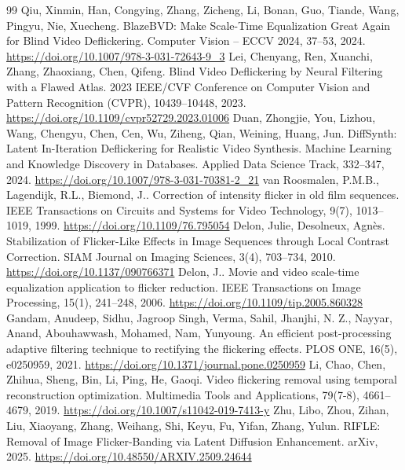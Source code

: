 \documentclass[twocolumn,10pt]{svjour3}
\begin{document}
\begin{thebibliography}{99}
\footnotesize
\setlength{\itemsep}{0pt}
\setlength{\parsep}{0pt}
 Qiu, Xinmin, Han, Congying, Zhang, Zicheng, Li, Bonan, Guo, Tiande, Wang, Pingyu, Nie, Xuecheng. BlazeBVD: Make Scale-Time Equalization Great Again for Blind Video Deflickering. Computer Vision – ECCV 2024, 37–53, 2024. \url{https://doi.org/10.1007/978-3-031-72643-9_3}
 Lei, Chenyang, Ren, Xuanchi, Zhang, Zhaoxiang, Chen, Qifeng. Blind Video Deflickering by Neural Filtering with a Flawed Atlas. 2023 IEEE/CVF Conference on Computer Vision and Pattern Recognition (CVPR), 10439–10448, 2023. \url{https://doi.org/10.1109/cvpr52729.2023.01006}
 Duan, Zhongjie, You, Lizhou, Wang, Chengyu, Chen, Cen, Wu, Ziheng, Qian, Weining, Huang, Jun. DiffSynth: Latent In-Iteration Deflickering for Realistic Video Synthesis. Machine Learning and Knowledge Discovery in Databases. Applied Data Science Track, 332–347, 2024. \url{https://doi.org/10.1007/978-3-031-70381-2_21}
 van Roosmalen, P.M.B., Lagendijk, R.L., Biemond, J.. Correction of intensity flicker in old film sequences. IEEE Transactions on Circuits and Systems for Video Technology, 9(7), 1013–1019, 1999. \url{https://doi.org/10.1109/76.795054}
 Delon, Julie, Desolneux, Agnès. Stabilization of Flicker-Like Effects in Image Sequences through Local Contrast Correction. SIAM Journal on Imaging Sciences, 3(4), 703–734, 2010. \url{https://doi.org/10.1137/090766371}
 Delon, J.. Movie and video scale-time equalization application to flicker reduction. IEEE Transactions on Image Processing, 15(1), 241–248, 2006. \url{https://doi.org/10.1109/tip.2005.860328}
 Gandam, Anudeep, Sidhu, Jagroop Singh, Verma, Sahil, Jhanjhi, N. Z., Nayyar, Anand, Abouhawwash, Mohamed, Nam, Yunyoung. An efficient post-processing adaptive filtering technique to rectifying the flickering effects. PLOS ONE, 16(5), e0250959, 2021. \url{https://doi.org/10.1371/journal.pone.0250959}
 Li, Chao, Chen, Zhihua, Sheng, Bin, Li, Ping, He, Gaoqi. Video flickering removal using temporal reconstruction optimization. Multimedia Tools and Applications, 79(7-8), 4661–4679, 2019. \url{https://doi.org/10.1007/s11042-019-7413-y}
 Zhu, Libo, Zhou, Zihan, Liu, Xiaoyang, Zhang, Weihang, Shi, Keyu, Fu, Yifan, Zhang, Yulun. RIFLE: Removal of Image Flicker-Banding via Latent Diffusion Enhancement. arXiv, 2025. \url{https://doi.org/10.48550/ARXIV.2509.24644}

\end{thebibliography}
\end{document}
